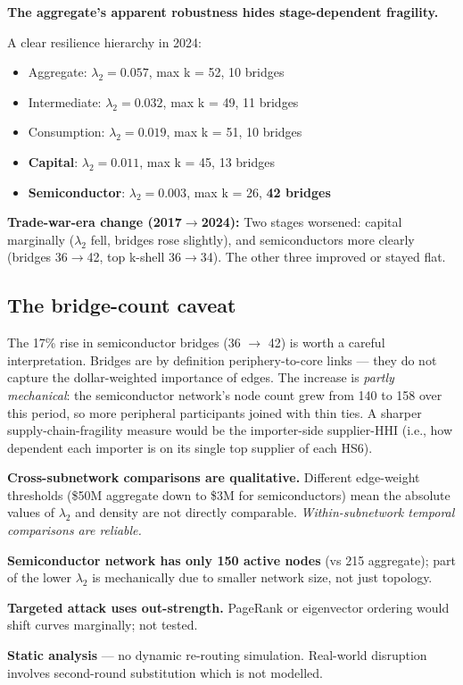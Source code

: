 \documentclass[11pt,a4paper]{article}
\begin{document}
\begin{findbox}
\textbf{The aggregate's apparent robustness hides stage-dependent fragility.}

A clear resilience hierarchy in 2024:
\begin{itemize}[leftmargin=*]
  \item Aggregate: $\lambda_2 = 0.057$, max k = 52, 10 bridges
  \item Intermediate: $\lambda_2 = 0.032$, max k = 49, 11 bridges
  \item Consumption: $\lambda_2 = 0.019$, max k = 51, 10 bridges
  \item \textbf{Capital}: $\lambda_2 = 0.011$, max k = 45, 13 bridges
  \item \textbf{Semiconductor}: $\lambda_2 = 0.003$, max k = 26, \textbf{42 bridges}
\end{itemize}

\textbf{Trade-war-era change (2017$\to$2024):}
Two stages worsened: capital marginally
($\lambda_2$ fell, bridges rose slightly), and semiconductors more
clearly (bridges 36$\to$42, top k-shell 36$\to$34). The other
three improved or stayed flat.
\end{findbox}

\subsection{The bridge-count caveat}

The 17\% rise in semiconductor bridges (36 $\to$ 42) is worth a careful
interpretation. Bridges are by definition periphery-to-core links — they
do not capture the dollar-weighted importance of edges. The increase is
\textit{partly mechanical}: the semiconductor network's node count grew
from 140 to 158 over this period, so more peripheral participants joined
with thin ties. A sharper supply-chain-fragility measure would be the
importer-side supplier-HHI (i.e., how dependent each importer is on its
single top supplier of each HS6).

\begin{limitbox}
\textbf{Cross-subnetwork comparisons are qualitative.} Different
edge-weight thresholds (\$50M aggregate down to \$3M for semiconductors)
mean the absolute values of $\lambda_2$ and density are not directly
comparable. \textit{Within-subnetwork temporal comparisons are reliable.}

\textbf{Semiconductor network has only 150 active nodes} (vs 215
aggregate); part of the lower $\lambda_2$ is mechanically due to smaller
network size, not just topology.

\textbf{Targeted attack uses out-strength.} PageRank or eigenvector
ordering would shift curves marginally; not tested.

\textbf{Static analysis} — no dynamic re-routing simulation. Real-world
disruption involves second-round substitution which is not modelled.
\end{limitbox}
\end{document}
